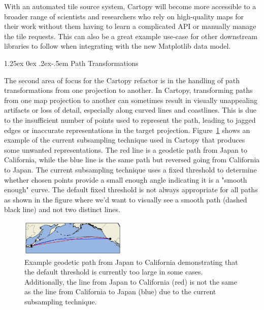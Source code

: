 \documentclass[12pt]{article}
\makeatletter
\numberwithin{page}{section}
\renewcommand{\paragraph}{%
  \@startsection{paragraph}{4}%
  {\z@}{1.25ex \@plus 0ex \@minus .2ex}{-.5em}%
  {\normalfont\normalsize\itshape\bfseries}%
}
\makeatother
\begin{document}
With an automated tile source system, Cartopy will become more accessible to a broader range of
scientists and researchers who rely on high-quality maps for their work without them having to learn
a complicated API or manually manage the tile requests. This can also be a great example use-case for other
downstream libraries to follow when integrating with the new Matplotlib data model.

\paragraph{Path Transformations}

The second area of focus for the Cartopy refactor is in the handling of path transformations from
one projection to another. In Cartopy, transforming paths from one map projection to another can
sometimes result in visually unappealing artifacts or loss of detail,
especially along curved lines and coastlines. This is due to the insufficient
number of points used to represent the path, leading to jagged edges or inaccurate
representations in the target projection.
Figure~\ref{fig:cartopy_interpolation} shows an example of the current subsampling technique
used in Cartopy that produces some unwanted representations.
The red line is a geodetic path from Japan to California, while the blue line
is the same path but reversed going from California to Japan. The current subsampling technique
uses a fixed threshold to determine whether chosen points provide a small enough angle indicating
it is a "smooth enough" curve. The default fixed threshold is not always appropriate for all
paths as shown in the figure where we'd want to visually see a smooth path (dashed black line) and not two distinct lines.

\begin{figure}
  \includegraphics[width=0.45\textwidth]{supplemental/cartopy_interpolation}
  \caption{\small Example geodetic path from Japan to California demonstrating
  that the default threshold is currently too large in some cases. Additionally,
  the line from Japan to California (red) is not the same as the line from
  California to Japan (blue) due to the current subsampling technique.}
  \label{fig:cartopy_interpolation}
\end{figure}
\end{document}
